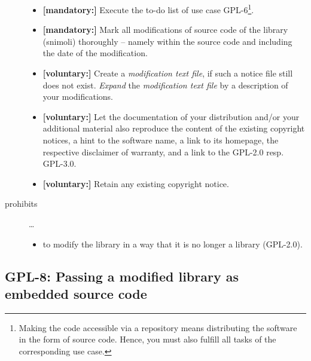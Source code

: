 \begin{description}
\begin{itemize}
  \item \textbf{[mandatory:]} Execute the to-do list of use case GPL-6\footnote{
  Making the code accessible via a repository means distributing the software in
  the form of source code. Hence, you must also fulfill all tasks of the
  corresponding use case.}.

  \item \textbf{[mandatory:]} Mark all modifications of source code of the
  library (snimoli) thoroughly -- namely within the source code and including
  the date of the modification.

  \item \textbf{[voluntary:]} Create a \emph{modification text file}, if such a
  notice file still does not exist. \emph{Expand} the \emph{modification text
  file} by a description of your modifications.

  \item \textbf{[voluntary:]} Let the documentation of your distribution and/or
  your additional material also reproduce the content of the existing
  copyright notices, a hint to the software name, a link to its homepage,
  the respective disclaimer of warranty, and a link to the GPL-2.0 resp.
  GPL-3.0.
  
  \item \textbf{[voluntary:]} Retain any existing copyright notice. 
  
\end{itemize}

\item[prohibits] \ldots
\begin{itemize}
  \item to modify the library in a way that it is no longer a library
  (GPL-2.0).
\end{itemize}

\end{description}

\subsection{GPL-8: Passing a modified library as embedded source code}
\label{OSUC-10-GPL}

